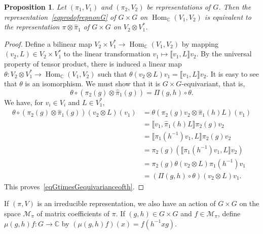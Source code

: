 \documentclass[12pt,reqno]{book}%
\newtheorem{proposition}{Proposition}[chapter]
\theoremstyle{definition}
\theoremstyle{remark}
\theoremstyle{theorem}
\theoremstyle{remark}
\DeclareMathOperator{\Hom}{Hom}
\begin{document}
\begin{proposition}\label{propequivoftworepnsonGtimesGi}%
    Let $(\pi_1, V_1)$ and $(\pi_2, V_2)$ be representations of $G$.
    Then the representation~\eqref{eqprodofrepnonG} of $G \times G$ on $\Hom_\mathbb{C}(V_1, V_2)$ is equivalent to the representation $\pi \otimes \widehat{\pi}_1$ of $G \times G$ on $V_2 \otimes V_1^*$.
\end{proposition}%
\begin{proof}%
    Define a bilinear map $V_2 \times V_1^* \to \Hom_\mathbb{C}(V_1, V_2)$ by mapping $(v_2, L) \in V_2 \times V_1^*$ to the linear transformation $v_1 \mapsto \llbracket v_1, L \rrbracket v_2$.
    By the universal property of tensor product, there is induced a linear map $\theta : V_2 \otimes V_1^* \to \Hom_\mathbb{C}(V_1, V_2)$ such that $\theta(v_2 \otimes L) v_1 = \llbracket v_1, L \rrbracket v_2$.
    It is easy to see that $\theta$ is an isomorphism.
    We must show that it is $G \times G$-equivariant, that is,
    \begin{equation}\label{eqGtimesGequivarianceofth}
        \theta \circ (\pi_2(g) \otimes \widehat{\pi}_1(g)) = \varPi(g, h) \circ \theta.
    \end{equation}
    We have, for $v_i \in V_i$ and $L \in V_1^*$,
    \begin{align*}
        \theta \circ (\pi_2(g) \otimes \widehat{\pi}_1(g))(v_2 \otimes L)(v_1) &= \theta(\pi_2(g)v_2 \otimes \widehat{\pi}_1(h)L)(v_1) \\
        &= {\llbracket v_1, \widehat{\pi}_1(h)L \rrbracket}\pi_2(g)v_2 \\
        &= {\llbracket \pi_1(h^{-1})v_1, L\rrbracket} \pi_2(g)v_2 \\
        &= \pi_2(g) ({\llbracket \pi_1(h^{-1})v_1, L\rrbracket}v_2) \\
        &= \pi_2(g)\theta(v_2 \otimes L) \pi_1(h^{-1})v_1 \\
        &= (\varPi(g, h) \circ \theta)(v_2 \otimes L)v_1.
    \end{align*}
    This proves~\eqref{eqGtimesGequivarianceofth}.
\end{proof}%

If $(\pi, V)$ is an irreducible representation, we also have an action of $G \times G$ on the space $\mathscr{M}_\pi$ of matrix coefficients of $\pi$.
If $(g, h) \in G \times G$ and $f \in \mathscr{M}_\pi$, define $\mu(g, h)f : G \to \mathbb{C}$ by $(\mu(g, h)f)(x) = f(h^{-1}xg)$.
\end{document}
